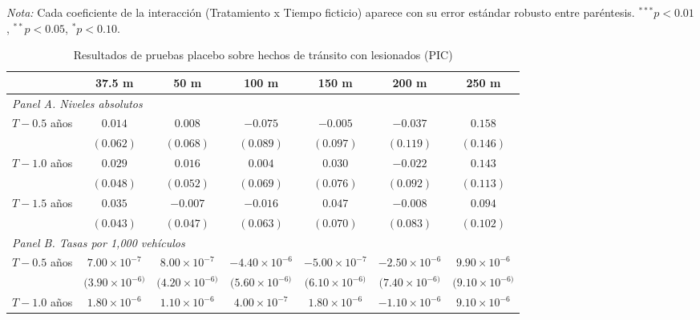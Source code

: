 \begin{table}[htbp]
    \vspace{0.4em}
    \begin{minipage}{0.93\textwidth}
        \tiny \textit{Nota:} Cada coeficiente de la interacción (Tratamiento x Tiempo ficticio) aparece con su error estándar robusto entre paréntesis. ${}^{***} p<0.01$, ${}^{**} p<0.05$, ${}^{*} p<0.10$.
    \end{minipage}
\end{table}

\clearpage

\begin{table}[htbp]
    \centering
    \caption{Resultados de pruebas placebo sobre hechos de tránsito con lesionados (PIC)}
    \label{tab:placebo-pic}
    \footnotesize
    \begin{adjustbox}{max width=\textwidth}
    \begin{tabular}{lcccccc}
        \toprule
        & 37.5 m & 50 m & 100 m & 150 m & 200 m & 250 m \\
        \midrule
        \multicolumn{7}{l}{\textit{Panel A. Niveles absolutos}} \\
        $T - 0.5$ años & $0.014$ & $0.008$ & $-0.075$ & $-0.005$ & $-0.037$ & $0.158$ \\
         & $(0.062)$ & $(0.068)$ & $(0.089)$ & $(0.097)$ & $(0.119)$ & $(0.146)$ \\
        $T - 1.0$ años & $0.029$ & $0.016$ & $0.004$ & $0.030$ & $-0.022$ & $0.143$ \\
         & $(0.048)$ & $(0.052)$ & $(0.069)$ & $(0.076)$ & $(0.092)$ & $(0.113)$ \\
        $T - 1.5$ años & $0.035$ & $-0.007$ & $-0.016$ & $0.047$ & $-0.008$ & $0.094$ \\
         & $(0.043)$ & $(0.047)$ & $(0.063)$ & $(0.070)$ & $(0.083)$ & $(0.102)$ \\
        \midrule
        \multicolumn{7}{l}{\textit{Panel B. Tasas por 1,000 vehículos}} \\
        $T - 0.5$ años & $7.00\times 10^{-7}$ & $8.00\times 10^{-7}$ & $-4.40\times 10^{-6}$ & $-5.00\times 10^{-7}$ & $-2.50\times 10^{-6}$ & $9.90\times 10^{-6}$ \\
         & $(3.90\times 10^{-6)}$ & $(4.20\times 10^{-6)}$ & $(5.60\times 10^{-6)}$ & $(6.10\times 10^{-6)}$ & $(7.40\times 10^{-6)}$ & $(9.10\times 10^{-6)}$ \\
        $T - 1.0$ años & $1.80\times 10^{-6}$ & $1.10\times 10^{-6}$ & $4.00\times 10^{-7}$ & $1.80\times 10^{-6}$ & $-1.10\times 10^{-6}$ & $9.10\times 10^{-6}$ \\

\end{tabular}
\end{adjustbox}
\end{table}
